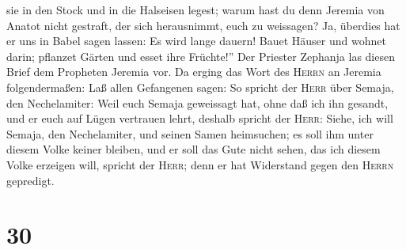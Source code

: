 sie in den Stock und in die Halseisen legest;  warum hast
du denn Jeremia von Anatot nicht gestraft, der sich herausnimmt, euch zu
weissagen?  Ja, überdies hat er uns in Babel sagen
lassen: Es wird lange dauern! Bauet Häuser und wohnet darin; pflanzet
Gärten und esset ihre Früchte!''  Der Priester Zephanja
las diesen Brief dem Propheten Jeremia vor.  Da erging
das Wort des \textsc{Herrn} an Jeremia folgendermaßen: 
Laß allen Gefangenen sagen: So spricht der \textsc{Herr} über Semaja,
den Nechelamiter: Weil euch Semaja geweissagt hat, ohne daß ich ihn
gesandt, und er euch auf Lügen vertrauen lehrt,  deshalb
spricht der \textsc{Herr}: Siehe, ich will Semaja, den Nechelamiter, und
seinen Samen heimsuchen; es soll ihm unter diesem Volke keiner bleiben,
und er soll das Gute nicht sehen, das ich diesem Volke erzeigen will,
spricht der \textsc{Herr}; denn er hat Widerstand gegen den
\textsc{Herrn} gepredigt.

\hypertarget{section-29}{%
\section{30}\label{section-29}}

